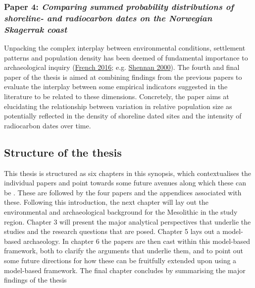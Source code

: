 \documentclass[
  a4paper,
  oneside]{uiophdthesis}
\begin{document}
\hypertarget{paper-4-comparing-summed-probability-distributions-of-shoreline--and-radiocarbon-dates-on-the-norwegian-skagerrak-coast}{%
\subsubsection{\texorpdfstring{Paper 4: \emph{Comparing summed probability distributions of shoreline- and radiocarbon dates on the Norwegian Skagerrak coast}}{Paper 4: Comparing summed probability distributions of shoreline- and radiocarbon dates on the Norwegian Skagerrak coast}}\label{paper-4-comparing-summed-probability-distributions-of-shoreline--and-radiocarbon-dates-on-the-norwegian-skagerrak-coast}}

Unpacking the complex interplay between environmental conditions, settlement patterns and population density has been deemed of fundamental importance to archaeological inquiry (\protect\hyperlink{ref-french2016}{French 2016}; e.g. \protect\hyperlink{ref-shennan2000}{Shennan 2000}). The fourth and final paper of the thesis is aimed at combining findings from the previous papers to evaluate the interplay between some empirical indicators suggested in the literature to be related to these dimensions. Concretely, the paper aims at elucidating the relationship between variation in relative population size as potentially reflected in the density of shoreline dated sites and the intensity of radiocarbon dates over time.

\hypertarget{structure-of-the-thesis}{%
\subsection{Structure of the thesis}\label{structure-of-the-thesis}}

This thesis is structured as six chapters in this synopsis, which contextualises the individual papers and point towards some future avenues along which these can be . These are followed by the four papers and the appendices associated with these. Following this introduction, the next chapter will lay out the environmental and archaeological background for the Mesolithic in the study region. Chapter 3 will present the major analytical perspectives that underlie the studies and the research questions that are posed. Chapter 5 lays out a model-based archaeology. In chapter 6 the papers are then cast within this model-based framework, both to clarify the arguments that underlie them, and to point out some future directions for how these can be fruitfully extended upon using a model-based framework. The final chapter concludes by summarising the major findings of the thesis
\end{document}
